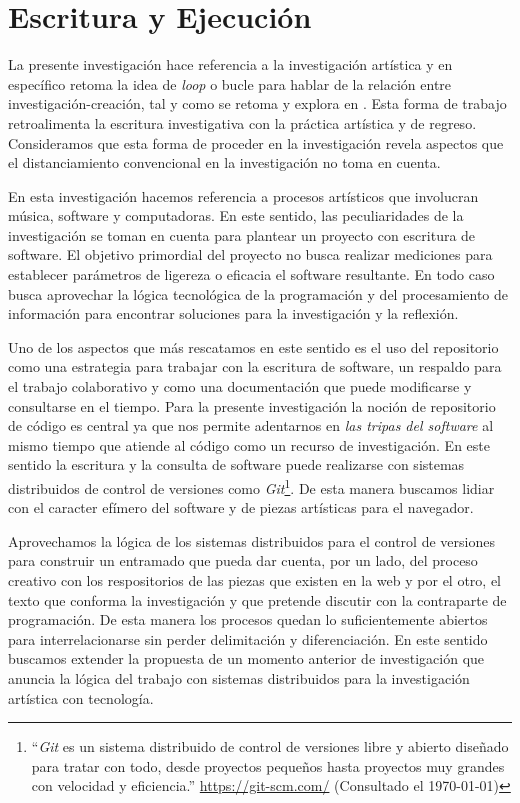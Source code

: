 

\section*{Escritura y Ejecución}

La presente investigación hace referencia a la investigación artística y en específico retoma la idea de \textit{loop} o bucle para hablar de la relación entre investigación-creación, tal y como se retoma y explora en \citep{ocelotlMas}. Esta forma de trabajo retroalimenta la escritura investigativa con la práctica artística y de regreso. Consideramos que esta forma de proceder en la investigación revela aspectos que el distanciamiento convencional en la investigación no toma en cuenta.

En esta investigación hacemos referencia a procesos artísticos que involucran música, software y computadoras. En este sentido, las peculiaridades de la investigación se toman en cuenta para plantear un proyecto con escritura de software. El objetivo primordial del proyecto no busca realizar mediciones para establecer parámetros de ligereza o eficacia el software resultante. En todo caso busca aprovechar la lógica tecnológica de la programación y del procesamiento de información para encontrar soluciones para la investigación y la reflexión.

Uno de los aspectos que más rescatamos en este sentido es el uso del repositorio como una estrategia para trabajar con la escritura de software, un respaldo para el trabajo colaborativo y como una documentación que puede modificarse y consultarse en el tiempo. Para la presente investigación la noción de repositorio de código es central ya que nos permite adentarnos en \textit{las tripas del software} al mismo tiempo que atiende al código como un recurso de investigación. En este sentido la escritura y la consulta de software puede realizarse con sistemas distribuidos de control de versiones como \textit{Git}\footnote{``\textit{Git} es un sistema distribuido de control de versiones libre y abierto diseñado para tratar con todo, desde proyectos pequeños hasta proyectos muy grandes con velocidad y eficiencia.'' \url{https://git-scm.com/} (Consultado el \today)}. De esta manera buscamos lidiar con el caracter efímero del software y de piezas artísticas para el navegador. 

Aprovechamos la lógica de los sistemas distribuidos para el control de versiones para construir un entramado que pueda dar cuenta, por un lado, del proceso creativo con los respositorios de las piezas que existen en la web y por el otro, el texto que conforma la investigación y que pretende discutir con la contraparte de programación. De esta manera los procesos quedan lo suficientemente abiertos para interrelacionarse sin perder delimitación y diferenciación. En este sentido buscamos extender la propuesta de un momento anterior de investigación que anuncia la lógica del trabajo con sistemas distribuidos para la investigación artística con tecnología.

